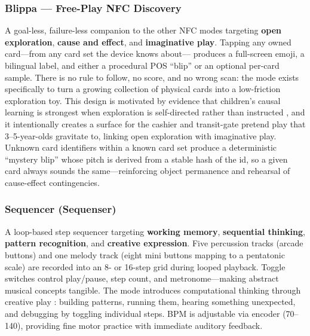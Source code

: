 \documentclass[12pt, a4paper]{article}
\begin{document}
\subsubsection{Blippa --- Free-Play NFC Discovery}
A goal-less, failure-less companion to the other NFC modes targeting
\textbf{open exploration}, \textbf{cause and effect}, and \textbf{imaginative
play}. Tapping any owned card---from any card set the device knows about---
produces a full-screen emoji, a bilingual label, and either a procedural POS
``blip'' or an optional per-card sample. There is no rule to follow, no score,
and no wrong scan: the mode exists specifically to turn a growing collection
of physical cards into a low-friction exploration toy. This design is
motivated by evidence that children's causal learning is strongest when
exploration is self-directed rather than instructed \citep{bonawitz2011double},
and it intentionally creates a surface for the cashier and transit-gate
pretend play that 3--5-year-olds gravitate to, linking open exploration with
imaginative play. Unknown card identifiers within a known card set produce a
deterministic ``mystery blip'' whose pitch is derived from a stable hash of
the id, so a given card always sounds the same---reinforcing object
permanence and rehearsal of cause-effect contingencies.

\subsubsection{Sequencer (Sequenser)}
A loop-based step sequencer targeting \textbf{working memory},
\textbf{sequential thinking}, \textbf{pattern recognition}, and
\textbf{creative expression}. Five percussion tracks (arcade buttons) and one
melody track (eight mini buttons mapping to a pentatonic scale) are recorded
into an 8- or 16-step grid during looped playback. Toggle switches control
play/pause, step count, and metronome---making abstract musical concepts
tangible. The mode introduces computational thinking through creative play
\citep{papert1980mindstorms, bers2018coding}: building patterns, running them,
hearing something unexpected, and debugging by toggling individual steps. BPM is adjustable via
encoder (70--140), providing fine motor practice with immediate auditory
feedback.
\end{document}
